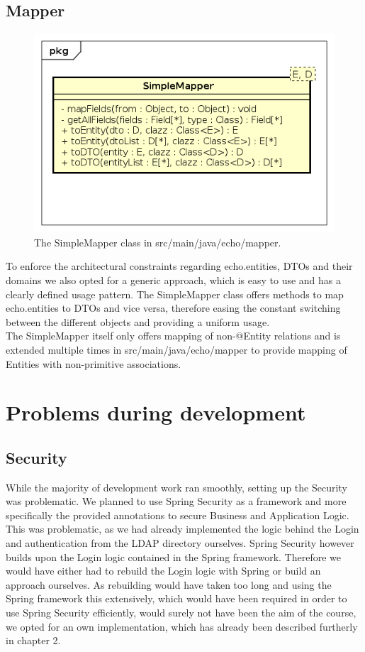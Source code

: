 \documentclass{article}
\begin{document}
\subsection{Mapper}
\begin{figure}[h]
\caption{The SimpleMapper class in src/main/java/echo/mapper.}
\centering
\includegraphics[width=\textwidth]{mapper}
\end{figure}
To enforce the architectural constraints regarding echo.entities, DTOs and their domains we also opted for a generic approach, which is easy to use and has a clearly defined usage pattern. The SimpleMapper class offers methods to map echo.entities to DTOs and vice versa, therefore easing the constant switching between the different objects and providing a uniform usage.\\
The SimpleMapper itself only offers mapping of non-@Entity relations and is extended multiple times in src/main/java/echo/mapper to provide mapping of Entities with non-primitive associations.

\section{Problems during development}
\subsection{Security}
While the majority of development work ran smoothly, setting up the Security was problematic. We planned to use Spring Security as a framework and more specifically the provided annotations to secure Business and Application Logic. This was problematic, as we had already implemented the logic behind the Login and authentication from the LDAP directory ourselves. Spring Security however builds upon the Login logic contained in the Spring framework. Therefore we would have either had to rebuild the Login logic with Spring or build an approach ourselves. As rebuilding would have taken too long and using the Spring framework this extensively, which would have been required in order to use Spring Security efficiently, would surely not have been the aim of the course, we opted for an own implementation, which has already been described furtherly in chapter 2.
\end{document}
